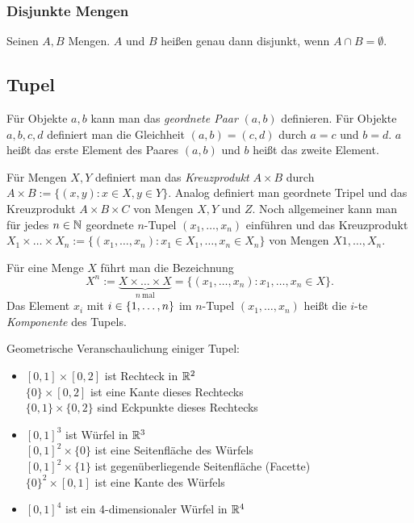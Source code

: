 \subsubsection{Disjunkte Mengen}

Seinen $ A,B $ Mengen. $ A $ und $ B $ heißen genau dann disjunkt, wenn $ A \cap B = \emptyset $.

\subsection{Tupel}

Für Objekte $ a,b $ kann man das \emph{geordnete Paar} $ (a,b) $ definieren. Für Objekte $ a,b,c,d $ definiert man die Gleichheit $ (a,b) = (c,d) $ durch $ a=c $ und $ b=d $. $ a $ heißt das erste Element des Paares $ (a,b) $ und $ b $ heißt das zweite Element.

Für Mengen $ X,Y $ definiert man das \emph{Kreuzprodukt} $ A \times B $ durch $ A \times B := \{ (x,y) : x \in X, y \in Y \} $. Analog definiert man geordnete Tripel und das Kreuzprodukt $ A \times B \times C $ von Mengen $ X,Y $ und $ Z $. Noch allgemeiner kann man für jedes $ n \in \mathbb N $ geordnete $ n $-Tupel $ (x_1,\ldots,x_n) $ einführen und das Kreuzprodukt $ X_1 \times \ldots \times X_n := \{ (x_1,\ldots,x_n) : x_1 \in X_1, \ldots , x_n \in X_n \} $ von Mengen $ X1,\ldots,X_n $.

Für eine Menge $ X $ führt man die Bezeichnung
\begin{equation*}
	X^n := \underbrace{X \times \ldots \times X}_{n \:\text{mal}} = \{ (x_1,\ldots,x_n) : x_1,\ldots,x_n \in X \}.
\end{equation*}
Das Element $ x_i $ mit $ i \in \{ 1,\ldots,n \} $ im $ n $-Tupel $ (x_1,\ldots,x_n) $ heißt die $ i $-te \emph{Komponente} des Tupels.

\begin{bsp} Geometrische Veranschaulichung einiger Tupel:
	\begin{itemize}
		\item $ [0,1] \times [0,2] $ ist Rechteck in $ \mathbb R^2 $\\
		$ \{ 0 \} \times [0,2] $ ist eine Kante dieses Rechtecks\\
		$ \{ 0,1 \} \times \{ 0,2 \} $ sind Eckpunkte dieses Rechtecks
		\item $ [0,1]^3 $ ist Würfel in $ \mathbb R^3 $\\
		$ [0,1]^2 \times \{ 0 \} $ ist eine Seitenfläche des Würfels\\
		$ [0,1]^2 \times \{ 1 \} $ ist gegenüberliegende Seitenfläche (Facette)\\
		$ \{ 0 \}^2 \times [0,1] $ ist eine Kante des Würfels
		\item $ [0,1]^4 $ ist ein 4-dimensionaler Würfel in $ \mathbb R^4 $
	\end{itemize}
\end{bsp}


